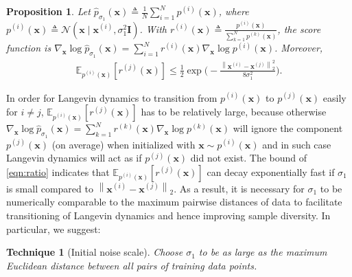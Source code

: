 \documentclass{article}
\newcommand{\mbb}[1]{\mathbb{#1}}
\newcommand{\mcal}{\mathcal}
\newcommand{\norm}[1]{\left\lVert#1\right\rVert}
\newtheorem{recipe}{Technique}
\newtheorem{proposition}{Proposition}
\newcommand{\bfx}{\mathbf{x}}
\newcommand{\bfI}{\mathbf{I}}
\begin{document}
\begin{proposition}\label{prop:init_noise}
Let $\hat{p}_{\sigma_1}(\bfx) \triangleq \frac{1}{N} \sum_{i=1}^N p^{(i)}(\bfx)$, where $p^{(i)}(\bfx) \triangleq \mcal{N}(\bfx \mid \bfx^{(i)}, \sigma_1^2 \bfI)$. With $r^{(i)}(\bfx) \triangleq \frac{p^{(i)}(\bfx)}{\sum_{k=1}^N  p^{(k)}(\bfx) }$, the score function is $\nabla_\bfx \log \hat{p}_{\sigma_1}(\bfx) = \sum_{i=1}^N r^{(i)}(\bfx) \nabla_\bfx \log p^{(i)}(\bfx)$. Moreover,
\begin{align}
    \mbb{E}_{p^{(i)}(\bfx)}[r^{(j)}(\bfx)] \leq \frac{1}{2} \exp \bigg( -\frac{\norm{\bfx^{(i)} - \bfx^{(j)}}_2^2}{8\sigma_1^2} \bigg). \label{eqn:ratio}
\end{align}
\end{proposition}
In order for Langevin dynamics to transition from $p^{(i)}(\bfx)$ to $p^{(j)}(\bfx)$ easily for $i \neq j$, $\mbb{E}_{p^{(i)}(\bfx)}[r^{(j)}(\bfx)]$ has to be relatively large, because otherwise $\nabla_\bfx \log \hat{p}_{\sigma_1}(\bfx) = \sum_{k=1}^N r^{(k)}(\bfx) \nabla_\bfx \log p^{(k)}(\bfx)$ will ignore the component $p^{(j)}(\bfx)$ (on average) when initialized with $\bfx \sim p^{(i)}(\bfx)$ and in such case Langevin dynamics will act as if $p^{(j)}(\bfx)$ did not exist. The bound of \cref{eqn:ratio} indicates that $\mbb{E}_{p^{(i)}(\bfx)}[r^{(j)}(\bfx)]$ can decay exponentially fast if $\sigma_1$ is small compared to $\norm{\bfx^{(i)} - \bfx^{(j)}}_2$. As a result, it is necessary for $\sigma_1$ to be numerically comparable to the maximum pairwise distances of data to facilitate transitioning of Langevin dynamics and hence improving sample diversity. In particular, we suggest: 
\begin{recipe}[Initial noise scale]\label{rec:init_noise}
    Choose $\sigma_1$ to be as large as the maximum Euclidean distance between all pairs of training data points.\end{recipe}
\end{document}

